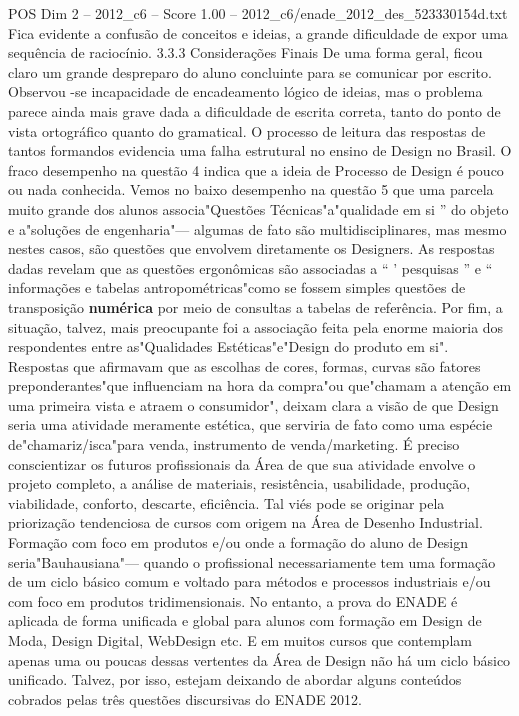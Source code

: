 \begin{textsample}{POS Dim 2 – 2012\_c6 – Score 1.00 – 2012\_c6/enade\_2012\_des\_523330154d.txt}
Fica evidente a confusão de conceitos e ideias, a grande dificuldade de expor uma sequência de raciocínio. 3.3.3 Considerações Finais De uma forma geral, ficou claro um grande despreparo do aluno concluinte para se comunicar por escrito.
Observou -se incapacidade de encadeamento lógico de ideias, mas o problema parece ainda mais grave dada a dificuldade de escrita correta, tanto do ponto de vista ortográfico quanto do gramatical.
O processo de leitura das respostas de tantos formandos evidencia uma falha estrutural no ensino de Design no Brasil.
O fraco desempenho na questão 4 indica que a ideia de Processo de Design é pouco ou nada conhecida.
Vemos no baixo desempenho na questão 5 que uma parcela muito grande dos alunos associa"Questões Técnicas"a"qualidade em si ” do objeto e a"soluções de engenharia"— algumas de fato são multidisciplinares, mas mesmo nestes casos, são questões que envolvem diretamente os Designers.
As respostas dadas revelam que as questões ergonômicas são associadas a “ ' pesquisas ” e “ informações e tabelas antropométricas"como se fossem simples questões de transposição \textbf{numérica} por meio de consultas a tabelas de referência.
Por fim, a situação, talvez, mais preocupante foi a associação feita pela enorme maioria dos respondentes entre as"Qualidades Estéticas"e"Design do produto em si".
Respostas que afirmavam que as escolhas de cores, formas, curvas são fatores preponderantes"que influenciam na hora da compra"ou que"chamam a atenção em uma primeira vista e atraem o consumidor", deixam clara a visão de que Design seria uma atividade meramente estética, que serviria de fato como uma espécie de"chamariz/isca"para venda, instrumento de venda/marketing.
É preciso conscientizar os futuros profissionais da Área de que sua atividade envolve o projeto completo, a análise de materiais, resistência, usabilidade, produção, viabilidade, conforto, descarte, eficiência.
Tal viés pode se originar pela priorização tendenciosa de cursos com origem na Área de Desenho Industrial.
Formação com foco em produtos e/ou onde a formação do aluno de Design seria"Bauhausiana"— quando o profissional necessariamente tem uma formação de um ciclo básico comum e voltado para métodos e processos industriais e/ou com foco em produtos tridimensionais.
No entanto, a prova do ENADE é aplicada de forma unificada e global para alunos com formação em Design de Moda, Design Digital, WebDesign etc.
E em muitos cursos que contemplam apenas uma ou poucas dessas vertentes da Área de Design não há um ciclo básico unificado.
Talvez, por isso, estejam deixando de abordar alguns conteúdos cobrados pelas três questões discursivas do ENADE 2012.

\end{textsample}
